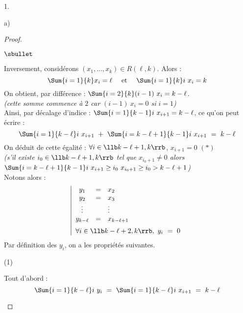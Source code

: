 \begin{noliste}{1.}
\begin{noliste}{a)}
\begin{proof}
\begin{noliste}{$\sbullet$}
      \item Inversement, considérons $(x_1, \ldots, x_k) \in R(\ell,
        k)$. Alors :
        \[
        \Sum{i = 1}{k} x_i = \ell \quad \text{ et } \quad \Sum{i=1}{k}
        i \ x_i = k
        \]
        On obtient, par différence : $\Sum{i=2}{k} (i-1) \ x_i = k -
        \ell$.\\
        {\it (cette somme commence à $2$ car $(i-1) \ x_i = 0$ si $i =
          1$)}\\
        Ainsi, par décalage d'indice : $\Sum{i=1}{k-1} i \ x_{i+1} = k
        - \ell$, ce qu'on peut écrire :
        \[
        \Sum{i=1}{k-\ell} i \ x_{i+1} \ + \ \Sum{i=k-\ell+1}{k-1} i \
        x_{i+1} \ = \ k - \ell
        \]
        On déduit de cette égalité : $\forall i \in \llb k-\ell+1,
        k\rrb$, $x_{i+1} = 0$ \qquad $(*)$\\
        {\it (s'il existe $i_0 \in \llb k-\ell+1, k\rrb$ tel que
          $x_{i_0+1} \neq 0$ alors $\Sum{i=k-\ell+1}{k-1} i \ x_{i+1}
          \geq i_0 \ x_{i_0 + 1} \geq i_0 > k-\ell+1$)}\\
        Notons alors :
        \[
        \left|
        \begin{array}{ccl}
          y_1 & = & x_2
          \\
          y_2 & = & x_3 
          \\
          \vdots & & \vdots
          \\
          y_{k - \ell} & = & x_{k - \ell + 1}
          \\[.2cm]
          \multicolumn{3}{l}{\forall i \in \llb k - \ell + 2, k \rrb,
          \ y_i \ = \ 0}
        \end{array}
        \right.
        \]
        Par définition des $y_i$, on a les propriétés suivantes.
        \begin{noliste}{(1)}
        \item Tout d'abord :
          \[
          \Sum{i = 1}{k - \ell} i \ y_i \ = \ \Sum{i = 1}{k - \ell} i
          \ x_{i+1} \ = \ k - \ell
          \]


\end{noliste}
\end{noliste}
\end{proof}
\end{noliste}
\end{noliste}
